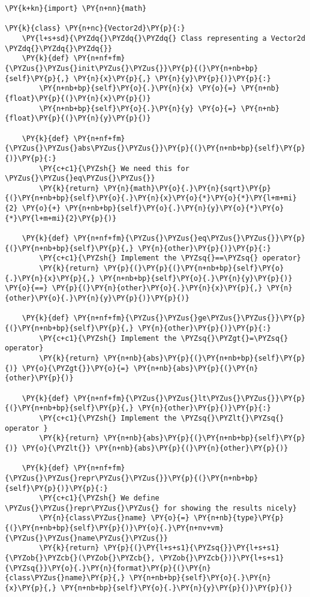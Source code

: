 \begin{Verbatim}[label=\makebox{\url{https://bitbucket.org/lbaldini/programming/src/tip/snippets/vector2d\_comparable.py}},commandchars=\\\{\}]
\PY{k+kn}{import} \PY{n+nn}{math}

\PY{k}{class} \PY{n+nc}{Vector2d}\PY{p}{:}
    \PY{l+s+sd}{\PYZdq{}\PYZdq{}\PYZdq{} Class representing a Vector2d \PYZdq{}\PYZdq{}\PYZdq{}}   
    \PY{k}{def} \PY{n+nf+fm}{\PYZus{}\PYZus{}init\PYZus{}\PYZus{}}\PY{p}{(}\PY{n+nb+bp}{self}\PY{p}{,} \PY{n}{x}\PY{p}{,} \PY{n}{y}\PY{p}{)}\PY{p}{:}
        \PY{n+nb+bp}{self}\PY{o}{.}\PY{n}{x} \PY{o}{=} \PY{n+nb}{float}\PY{p}{(}\PY{n}{x}\PY{p}{)}
        \PY{n+nb+bp}{self}\PY{o}{.}\PY{n}{y} \PY{o}{=} \PY{n+nb}{float}\PY{p}{(}\PY{n}{y}\PY{p}{)}
    
    \PY{k}{def} \PY{n+nf+fm}{\PYZus{}\PYZus{}abs\PYZus{}\PYZus{}}\PY{p}{(}\PY{n+nb+bp}{self}\PY{p}{)}\PY{p}{:}
        \PY{c+c1}{\PYZsh{} We need this for \PYZus{}\PYZus{}eq\PYZus{}\PYZus{}}
        \PY{k}{return} \PY{n}{math}\PY{o}{.}\PY{n}{sqrt}\PY{p}{(}\PY{n+nb+bp}{self}\PY{o}{.}\PY{n}{x}\PY{o}{*}\PY{o}{*}\PY{l+m+mi}{2} \PY{o}{+} \PY{n+nb+bp}{self}\PY{o}{.}\PY{n}{y}\PY{o}{*}\PY{o}{*}\PY{l+m+mi}{2}\PY{p}{)}
    
    \PY{k}{def} \PY{n+nf+fm}{\PYZus{}\PYZus{}eq\PYZus{}\PYZus{}}\PY{p}{(}\PY{n+nb+bp}{self}\PY{p}{,} \PY{n}{other}\PY{p}{)}\PY{p}{:}
        \PY{c+c1}{\PYZsh{} Implement the \PYZsq{}==\PYZsq{} operator}
        \PY{k}{return} \PY{p}{(}\PY{p}{(}\PY{n+nb+bp}{self}\PY{o}{.}\PY{n}{x}\PY{p}{,} \PY{n+nb+bp}{self}\PY{o}{.}\PY{n}{y}\PY{p}{)} \PY{o}{==} \PY{p}{(}\PY{n}{other}\PY{o}{.}\PY{n}{x}\PY{p}{,} \PY{n}{other}\PY{o}{.}\PY{n}{y}\PY{p}{)}\PY{p}{)}
        
    \PY{k}{def} \PY{n+nf+fm}{\PYZus{}\PYZus{}ge\PYZus{}\PYZus{}}\PY{p}{(}\PY{n+nb+bp}{self}\PY{p}{,} \PY{n}{other}\PY{p}{)}\PY{p}{:}
        \PY{c+c1}{\PYZsh{} Implement the \PYZsq{}\PYZgt{}=\PYZsq{} operator}
        \PY{k}{return} \PY{n+nb}{abs}\PY{p}{(}\PY{n+nb+bp}{self}\PY{p}{)} \PY{o}{\PYZgt{}}\PY{o}{=} \PY{n+nb}{abs}\PY{p}{(}\PY{n}{other}\PY{p}{)}
        
    \PY{k}{def} \PY{n+nf+fm}{\PYZus{}\PYZus{}lt\PYZus{}\PYZus{}}\PY{p}{(}\PY{n+nb+bp}{self}\PY{p}{,} \PY{n}{other}\PY{p}{)}\PY{p}{:}
        \PY{c+c1}{\PYZsh{} Implement the \PYZsq{}\PYZlt{}\PYZsq{} operator }
        \PY{k}{return} \PY{n+nb}{abs}\PY{p}{(}\PY{n+nb+bp}{self}\PY{p}{)} \PY{o}{\PYZlt{}} \PY{n+nb}{abs}\PY{p}{(}\PY{n}{other}\PY{p}{)}
        
    \PY{k}{def} \PY{n+nf+fm}{\PYZus{}\PYZus{}repr\PYZus{}\PYZus{}}\PY{p}{(}\PY{n+nb+bp}{self}\PY{p}{)}\PY{p}{:}
        \PY{c+c1}{\PYZsh{} We define \PYZus{}\PYZus{}repr\PYZus{}\PYZus{} for showing the results nicely}
        \PY{n}{class\PYZus{}name} \PY{o}{=} \PY{n+nb}{type}\PY{p}{(}\PY{n+nb+bp}{self}\PY{p}{)}\PY{o}{.}\PY{n+nv+vm}{\PYZus{}\PYZus{}name\PYZus{}\PYZus{}}
        \PY{k}{return} \PY{p}{(}\PY{l+s+s1}{\PYZsq{}}\PY{l+s+s1}{\PYZob{}\PYZcb{}(\PYZob{}\PYZcb{}, \PYZob{}\PYZcb{})}\PY{l+s+s1}{\PYZsq{}}\PY{o}{.}\PY{n}{format}\PY{p}{(}\PY{n}{class\PYZus{}name}\PY{p}{,} \PY{n+nb+bp}{self}\PY{o}{.}\PY{n}{x}\PY{p}{,} \PY{n+nb+bp}{self}\PY{o}{.}\PY{n}{y}\PY{p}{)}\PY{p}{)}
\end{Verbatim}